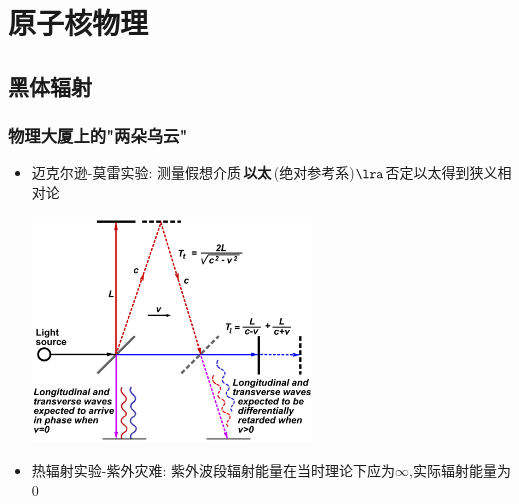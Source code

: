\documentclass{article}
\begin{document}
\section{原子核物理}
\subsection{黑体辐射}

\subsubsection{物理大厦上的"两朵乌云"}
\begin{itemize}
    \item 迈克尔逊-莫雷实验: 测量假想介质\,\textbf{以太}\,(绝对参考系)$\lra$否定以太得到狭义相对论

          \vspace{1em}

          \includegraphics[width=20em,keepaspectratio]{./pictures/4.png}

          \vspace{1em}

    \item 热辐射实验-紫外灾难: 紫外波段辐射能量在当时理论下应为$\infty$,实际辐射能量为$0$
\end{itemize}

\vspace{2em}
\end{document}
